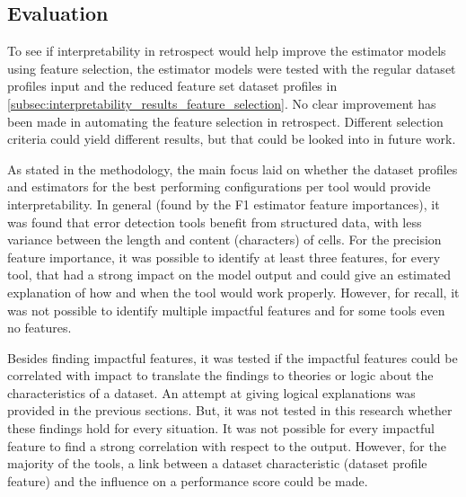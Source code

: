 \subsection{Evaluation}

To see if interpretability in retrospect would help improve the estimator models using feature selection, the estimator models were tested with the regular dataset profiles input and the reduced feature set dataset profiles in \autoref{subsec:interpretability_results_feature_selection}. No clear improvement has been made in automating the feature selection in retrospect. Different selection criteria could yield different results, but that could be looked into in future work. 


As stated in the methodology, the main focus laid on whether the dataset profiles and estimators for the best performing configurations per tool would provide interpretability. In general (found by the F1 estimator feature importances), it was found that error detection tools benefit from structured data, with less variance between the length and content (characters) of cells. 
For the precision feature importance, it was possible to identify at least three features, for every tool, that had a strong impact on the model output and could give an estimated explanation of how and when the tool would work properly.
However, for recall, it was not possible to identify multiple impactful features and for some tools even no features. 

Besides finding impactful features, it was tested if the impactful features could be correlated with impact to translate the findings to theories or logic about the characteristics of a dataset. An attempt at giving logical explanations was provided in the previous sections. But, it was not tested in this research whether these findings hold for every situation. It was not possible for every impactful feature to find a strong correlation with respect to the output. However, for the majority of the tools, a link between a dataset characteristic (dataset profile feature) and the influence on a performance score could be made. 

